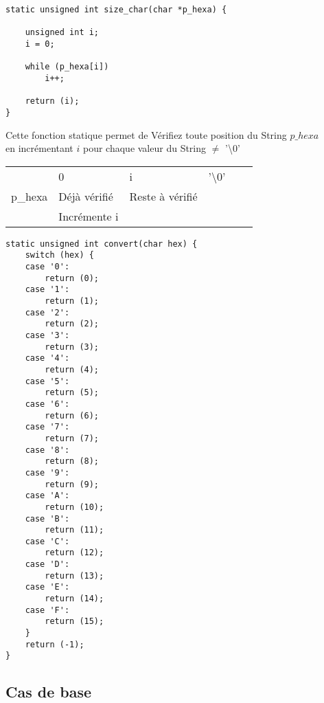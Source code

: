 \documentclass[a4paper, 11pt, oneside]{article}
\begin{document}
\newpage
		
		\begin{lstlisting}[caption={size\_char()}]
static unsigned int size_char(char *p_hexa) {

	unsigned int i;
	i = 0;

	while (p_hexa[i])
		i++;

	return (i);
}
		\end{lstlisting}
		
Cette fonction statique permet de Vérifiez toute position du String $p\_hexa$ 
\\ en incrémentant $i$ pour chaque valeur du String $\neq$ '\textbackslash$0$'
		
\begin{table}[!h]
\begin{tabular}{llllllll}
\multicolumn{1}{l|}{}        & 0                        & \multicolumn{1}{l|}{      }          & i                         & \multicolumn{1}{l|}{      }            & '\textbackslash{}0' &  &  \\ \cline{2-5}
\multicolumn{1}{l|}{p\_hexa} & \multicolumn{2}{l|}{\cellcolor[HTML]{FD6864}Déjà vérifié}       & \multicolumn{2}{l|}{\cellcolor[HTML]{38FFF8}Reste à vérifié}       &                     &  &  \\ \cline{2-5}
                             & \multicolumn{2}{l}{Incrémente i}                                &                           &                                        &                     &  &
\end{tabular}
\end{table}

		\begin{lstlisting}[caption={convert()}]
static unsigned int convert(char hex) {
	switch (hex) {
	case '0':
		return (0);
	case '1':
		return (1);
	case '2':
		return (2);
	case '3':
		return (3);
	case '4':
		return (4); 
	case '5':
		return (5); 
	case '6':
		return (6); 
	case '7':
		return (7);
	case '8':
		return (8); 
	case '9':
		return (9);
	case 'A':
		return (10); 
	case 'B':
		return (11);
	case 'C':
		return (12);
	case 'D':
		return (13);
	case 'E':
		return (14);
	case 'F':
		return (15); 
	}
	return (-1);
}
		\end{lstlisting}
		
	\subsection{Cas de base}\label{cas_base_code}
	
\end{document}
